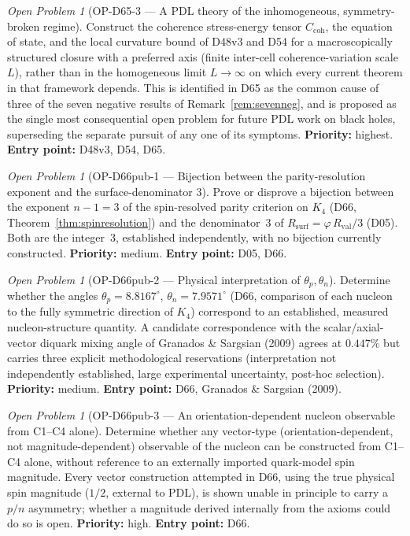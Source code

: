 \documentclass[11pt,a4paper]{article}
\newcommand{\Rval}{R_{\mathrm{val}}}
\theoremstyle{plain}
\theoremstyle{definition}
\theoremstyle{remark}
\newtheorem{openproblem}[theorem]{Open Problem}
\newcommand{\Rsurf}{R_{\mathrm{surf}}}
\newcommand{\Ccoh}{C_{\mathrm{coh}}}
\begin{document}
\begin{openproblem}[OP-D65-3 --- A PDL theory of the inhomogeneous, symmetry-broken regime]
\label{op:D65three}
Construct the coherence stress-energy tensor $\Ccoh$, the equation of state, and the local curvature bound of D48v3 and D54 for a macroscopically structured closure with a preferred axis (finite inter-cell coherence-variation scale $L$), rather than in the homogeneous limit $L\to\infty$ on which every current theorem in that framework depends. This is identified in D65 as the common cause of three of the seven negative results of Remark~\ref{rem:sevenneg}, and is proposed as the single most consequential open problem for future PDL work on black holes, superseding the separate pursuit of any one of its symptoms. \textbf{Priority:} highest. \textbf{Entry point:} D48v3, D54, D65.
\end{openproblem}

\begin{openproblem}[OP-D66pub-1 --- Bijection between the parity-resolution exponent and the surface-denominator 3]
\label{op:D66pubone}
Prove or disprove a bijection between the exponent $n-1=3$ of the spin-resolved parity criterion on $K_4$ (D66, Theorem~\ref{thm:spinresolution}) and the denominator~3 of $\Rsurf=\varphi\,\Rval/3$ (D05). Both are the integer~3, established independently, with no bijection currently constructed. \textbf{Priority:} medium. \textbf{Entry point:} D05, D66.
\end{openproblem}

\begin{openproblem}[OP-D66pub-2 --- Physical interpretation of $\theta_p,\theta_n$]
\label{op:D66pubtwo}
Determine whether the angles $\theta_p=8.8167^\circ$, $\theta_n=7.9571^\circ$ (D66, comparison of each nucleon to the fully symmetric direction of $K_4$) correspond to an established, measured nucleon-structure quantity. A candidate correspondence with the scalar/axial-vector diquark mixing angle of Granados \& Sargsian (2009) agrees at $0.447\%$ but carries three explicit methodological reservations (interpretation not independently established, large experimental uncertainty, post-hoc selection). \textbf{Priority:} medium. \textbf{Entry point:} D66, Granados \& Sargsian (2009).
\end{openproblem}

\begin{openproblem}[OP-D66pub-3 --- An orientation-dependent nucleon observable from C1--C4 alone]
\label{op:D66pubthree}
Determine whether any vector-type (orientation-dependent, not magnitude-dependent) observable of the nucleon can be constructed from C1--C4 alone, without reference to an externally imported quark-model spin magnitude. Every vector construction attempted in D66, using the true physical spin magnitude ($1/2$, external to PDL), is shown unable in principle to carry a $p/n$ asymmetry; whether a magnitude derived internally from the axioms could do so is open. \textbf{Priority:} high. \textbf{Entry point:} D66.
\end{openproblem}
\end{document}
